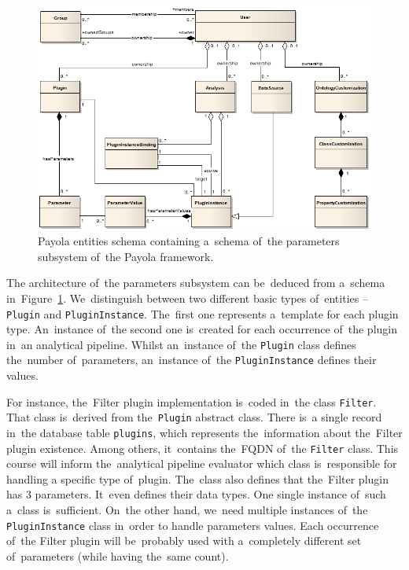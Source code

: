 \begin{figure}
	\centering
	\includegraphics[width=140mm]{img/params-schema.png}
	\caption{Payola entities schema containing a~schema of~the parameters 
	subsystem of~the Payola framework.~\cite{payola:dg}}
	\label{fig:params-schema}
\end{figure}

The architecture of~the parameters subsystem can be~deduced
from a~schema in~Figure~\ref{fig:params-schema}. We~distinguish between two 
different basic types of~entities -- \texttt{Plugin} and \texttt{PluginInstance}. The~first 
one represents a~template for each plugin type. An~instance of~the second one is~created for
each occurrence of~the plugin in~an analytical pipeline. Whilst an~instance of~the \texttt{Plugin}
class defines the~number of~parameters, an~instance of~the \texttt{PluginInstance} 
defines their values.

For instance, the~Filter plugin implementation is~coded in~the class \texttt{Filter}.
That class is~derived from the~\texttt{Plugin} abstract class. There is~a single record in~the database table
\texttt{plugins}, which represents the~information about the~Filter plugin existence.
Among others, it~contains the~FQDN of~the \texttt{Filter} class. This course will inform the~analytical
pipeline evaluator which class is~responsible for handling
a specific type of~plugin. The~class also defines that the~Filter plugin has 3 parameters. It~even 
defines their data types. One single instance of~such a~class is~sufficient. On~the other hand, we~need
multiple instances of~the \texttt{PluginInstance} class in~order to
handle parameters values. Each occurrence of~the Filter plugin will be~probably 
used with a~completely different set of~parameters (while having the~same count).

